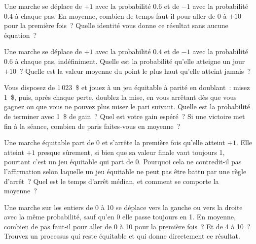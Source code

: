 \begin{question}\label{iq:iv1:random-walks-and-martingales:5}
Une marche se déplace de $+1$ avec la probabilité $0.6$ et de $-1$ avec la probabilité $0.4$ à chaque pas. En moyenne, combien de temps faut-il pour aller de 0 à $+10$ pour la première fois~? Quelle identité vous donne ce résultat sans aucune équation~?
\end{question}

\begin{question}\label{iq:iv1:random-walks-and-martingales:6}
Une marche se déplace de $+1$ avec la probabilité $0.4$ et de $-1$ avec la probabilité $0.6$ à chaque pas, indéfiniment. Quelle est la probabilité qu'elle atteigne un jour $+10$~? Quelle est la valeur moyenne du point le plus haut qu'elle atteint jamais~?
\end{question}

\begin{question}\label{iq:iv1:random-walks-and-martingales:7}
Vous disposez de 1\,023~\$ et jouez à un jeu équitable à parité en doublant~: misez 1~\$, puis, après chaque perte, doublez la mise, en vous arrêtant dès que vous gagnez ou que vous ne pouvez plus miser le pari suivant. Quelle est la probabilité de terminer avec 1~\$ de gain~? Quel est votre gain espéré~? Si une victoire met fin à la séance, combien de paris faites-vous en moyenne~?
\end{question}

\begin{question}\label{iq:iv1:random-walks-and-martingales:8}
Une marche équitable part de 0 et s'arrête la première fois qu'elle atteint $+1$. Elle atteint $+1$ presque sûrement, si bien que sa valeur finale vaut toujours 1, pourtant c'est un jeu équitable qui part de 0. Pourquoi cela ne contredit-il pas l'affirmation selon laquelle un jeu équitable ne peut pas être battu par une règle d'arrêt~? Quel est le temps d'arrêt médian, et comment se comporte la moyenne~?
\end{question}

\begin{question}\label{iq:iv1:random-walks-and-martingales:9}
Une marche sur les entiers de 0 à 10 se déplace vers la gauche ou vers la droite avec la même probabilité, sauf qu'en 0 elle passe toujours en 1. En moyenne, combien de pas faut-il pour aller de 0 à 10 pour la première fois~? Et de 4 à 10~? Trouvez un processus qui reste équitable et qui donne directement ce résultat.
\end{question}

